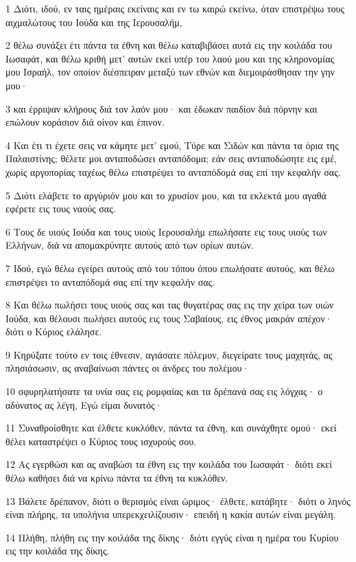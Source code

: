 \par 1 Διότι, ιδού, εν ταις ημέραις εκείναις και εν τω καιρώ εκείνω, όταν επιστρέψω τους αιχμαλώτους του Ιούδα και της Ιερουσαλήμ,
\par 2 θέλω συνάξει έτι πάντα τα έθνη και θέλω καταβιβάσει αυτά εις την κοιλάδα του Ιωσαφάτ, και θέλω κριθή μετ' αυτών εκεί υπέρ του λαού μου και της κληρονομίας μου Ισραήλ, τον οποίον διέσπειραν μεταξύ των εθνών και διεμοιράσθησαν την γην μου·
\par 3 και έρριψαν κλήρους διά τον λαόν μου· και έδωκαν παιδίον διά πόρνην και επώλουν κοράσιον διά οίνον και έπινον.
\par 4 Και έτι τι έχετε σεις να κάμητε μετ' εμού, Τύρε και Σιδών και πάντα τα όρια της Παλαιστίνης; θέλετε μοι ανταποδώσει ανταπόδομα; εάν σεις ανταποδώσητε εις εμέ, χωρίς αργοπορίας ταχέως θέλω επιστρέψει το ανταπόδομά σας επί την κεφαλήν σας.
\par 5 Διότι ελάβετε το αργύριόν μου και το χρυσίον μου, και τα εκλεκτά μου αγαθά εφέρετε εις τους ναούς σας.
\par 6 Τους δε υιούς Ιούδα και τους υιούς Ιερουσαλήμ επωλήσατε εις τους υιούς των Ελλήνων, διά να απομακρύνητε αυτούς από των ορίων αυτών.
\par 7 Ιδού, εγώ θέλω εγείρει αυτούς από του τόπου όπου επωλήσατε αυτούς, και θέλω επιστρέψει το ανταπόδομά σας επί την κεφαλήν σας.
\par 8 Και θέλω πωλήσει τους υιούς σας και τας θυγατέρας σας εις την χείρα των υιών Ιούδα, και θέλουσι πωλήσει αυτούς εις τους Σαβαίους, εις έθνος μακράν απέχον· διότι ο Κύριος ελάλησε.
\par 9 Κηρύξατε τούτο εν τοις έθνεσιν, αγιάσατε πόλεμον, διεγείρατε τους μαχητάς, ας πλησιάσωσιν, ας αναβαίνωσι πάντες οι άνδρες του πολέμου·
\par 10 σφυρηλατήσατε τα υνία σας εις ρομφαίας και τα δρέπανά σας εις λόγχας· ο αδύνατος ας λέγη, Εγώ είμαι δυνατός·
\par 11 Συναθροίσθητε και έλθετε κυκλόθεν, πάντα τα έθνη, και συνάχθητε ομού· εκεί θέλει καταστρέψει ο Κύριος τους ισχυρούς σου.
\par 12 Ας εγερθώσι και ας αναβώσι τα έθνη εις την κοιλάδα του Ιωσαφάτ· διότι εκεί θέλω καθήσει διά να κρίνω πάντα τα έθνη τα κυκλόθεν.
\par 13 Βάλετε δρέπανον, διότι ο θερισμός είναι ώριμος· έλθετε, κατάβητε· διότι ο ληνός είναι πλήρης, τα υπολήνια υπερεκχειλίζουσιν· επειδή η κακία αυτών είναι μεγάλη.
\par 14 Πλήθη, πλήθη εις την κοιλάδα της δίκης· διότι εγγύς είναι η ημέρα του Κυρίου εις την κοιλάδα της δίκης.
